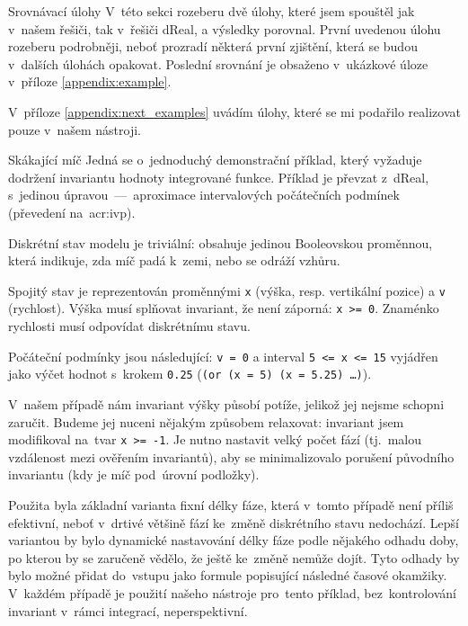 \documentclass[thesis=M,czech]{FITthesis}[2012/06/26]
\newcommand{\acrlabel}[1]{acr:#1}
\newcommand{\acr}[1]{\acrshort{\acrlabel{#1}}}
\newcommand{\id}[1]{\texttt{#1}}
\newcommand{\rf}[1]{\ref{#1}}
\begin{document}
\begin{section}{Srovnávací úlohy}\label{s:exp:examples}
V~této sekci rozeberu dvě úlohy,
které jsem spouštěl jak v~našem řešiči,
tak v~řešiči dReal,
a výsledky porovnal.
První uvedenou úlohu rozeberu podrobněji,
neboť prozradí některá první zjištění,
která se budou v~dalších úlohách opakovat.
Poslední srovnání je obsaženo v~ukázkové
úloze v~příloze \rf{appendix:example}.

V~příloze \rf{appendix:next_examples}
uvádím úlohy, které se mi podařilo
realizovat pouze v~našem nástroji.


\begin{subsection}{Skákající míč}\label{ss:exp:examples:ball}
Jedná se o~jednoduchý demonstrační příklad,
který vyžaduje dodržení invariantu hodnoty integrované funkce.
Příklad je převzat z~dReal,
s~jedinou úpravou~---~aproximace intervalových počátečních podmínek
(převedení na~\acr{ivp}).

Diskrétní stav modelu je triviální:
obsahuje jedinou Booleovskou proměnnou,
která indikuje, zda míč padá k~zemi, nebo se odráží vzhůru.

Spojitý stav je reprezentován proměnnými
\id{x} (výška, resp. vertikální pozice) a \id{v} (rychlost).
Výška musí splňovat invariant,
že není záporná: \id{x~>=~0}.
Znaménko rychlosti musí odpovídat diskrétnímu stavu.

Počáteční podmínky jsou následující:
\id{v~=~0} a interval \id{5~<=~x~<=~15}
vyjádřen jako výčet hodnot s~krokem \id{0.25}
(\id{(or (x~=~5) (x~=~5.25) \dots)}).

V~našem případě nám invariant výšky působí potíže,
jelikož jej nejsme schopni zaručit.
Budeme jej nuceni nějakým způsobem relaxovat:
invariant jsem modifikoval na~tvar \id{x~>=~-1}.
Je nutno nastavit velký počet fází
(tj.~malou vzdálenost mezi ověřením invariantů),
aby se minimalizovalo porušení původního invariantu
(kdy je míč pod~úrovní podložky).

Použita byla základní varianta
fixní délky fáze,
která v~tomto případě není příliš efektivní,
neboť v~drtivé většině fází ke~změně diskrétního stavu nedochází.
Lepší variantou by bylo dynamické nastavování délky fáze
podle nějakého odhadu doby,
po kterou by se zaručeně vědělo, že ještě ke~změně nemůže dojít.
Tyto odhady by bylo možné přidat do~vstupu
jako formule popisující následné časové okamžiky.
V~každém případě je použití našeho nástroje pro~tento příklad,
bez~kontrolování
invariant v~rámci integrací,
neperspektivní.


\end{subsection}
\end{section}
\end{document}
